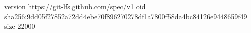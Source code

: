 version https://git-lfs.github.com/spec/v1
oid sha256:9dd05f27852a72dd4ebe70f896270278df1a7800f58da4bc84126e9448659f49
size 22000
